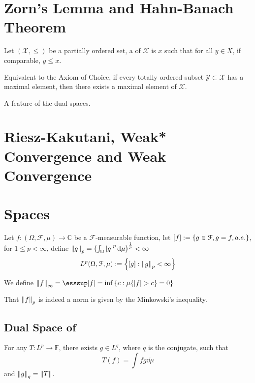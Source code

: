 \section{Zorn's Lemma and Hahn-Banach Theorem}

Let \((\mathcal{X},\leq)\) be a partially ordered set, a  of \(\mathcal{X}\) is \(x\) such that for all \(y\in X\), if comparable, \(y\leq x\). 

\begin{thm}
    Equivalent to the Axiom of Choice, if every totally ordered subset \(\mathcal{Y}\subset \mathcal{X}\) has a maximal element, then there exists a maximal element of \(\mathcal{X}\).
\end{thm}

\begin{thm}
    A feature of the dual spaces. 
\end{thm}

\begin{corollary}
    
\end{corollary}

\section{Riesz-Kakutani, Weak* Convergence and Weak Convergence}

\section{ Spaces}


Let \(f: (\Omega, \mathcal{F}, \mu) \to \mathbb{C}\) be a \(\mathcal{F}\)-measurable function, let \([f]:= \Bqty{g \in \mathcal{F}, g = f, a.e.}\), for \(1 \leq p < \infty\), define \(\norm{g}_{p} = \pqty{\int_{\Omega} \abs{g}^{p} \dd{\mu}}^{\frac{1}{p}} < \infty\)
\begin{equation*}
    L^{p}(\Omega, \mathcal{F}, \mu) := \Bqty{[g]: \norm{g}_{p} < \infty}
\end{equation*}

We define \(\norm{f}_{\infty} = \esssup \abs{f} = \inf \Bqty{c: \mu\Bqty{\abs{f}> c} = 0}\)

That \(\norm{f}_{p}\) is indeed a norm is given by the Minkowski's inequality. 

\subsection{Dual Space of }

For any  \(T : L^{p} \to \mathbb{F}\), there exists \(g \in L^{q}\), where \(q\) is the conjugate, such that 
\begin{equation*}
    T(f) = \int fg \dd{\mu}
\end{equation*}
and \(\norm{g}_{q} = \norm{T}\).



